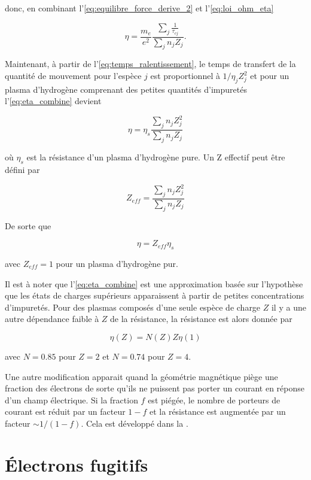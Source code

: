 \documentclass[main.tex]{subfiles}
\begin{document}
\noindent donc, en combinant l'\autoref{eq:equilibre_force_derive_2} et l'\autoref{eq:loi_ohm_eta}

\begin{equation}
	\eta = \frac{m_e}{e^2} \frac{\sum_j \frac{1}{\tau_{cj}}}{\sum_j n_j Z_j}.
	\label{eq:eta_combine}
\end{equation}

\noindent Maintenant, à partir de l'\autoref{eq:temps_ralentissement}, le temps de transfert de la quantité de mouvement pour l'espèce \( j \) est proportionnel à \( 1 / \eta_j Z_j^2 \) et pour un plasma d'hydrogène comprenant des petites quantités d'impuretés l'\autoref{eq:eta_combine} devient

\[
	\eta = \eta_s \frac{\sum_j n_j Z_j^2}{\sum_j n_j Z_j}
\]

\noindent où \( \eta_s \) est la résistance d'un plasma d'hydrogène pure.
Un Z effectif peut être défini par

\[
	Z_{eff} = \frac{\sum_j n_j Z_j^2}{\sum_j n_j Z_j}
\]

De sorte que

\begin{equation}
	\eta = Z_{eff} \eta_s
	\label{eq:resistance_eff}
\end{equation}

\noindent avec \( Z_{eff} = 1 \) pour un plasma d'hydrogène pur.

Il est à noter que l'\autoref{eq:eta_combine} est une approximation basée sur l'hypothèse que les états de charges supérieurs apparaissent à partir de petites concentrations d'impuretés.
Pour des plasmas composés d'une seule espèce de charge \( Z \) il y a une autre dépendance faible à \( Z \) de la résistance, la résistance est alors donnée par

\[
	\eta \left( Z \right) = N \left( Z \right) Z \eta \left( 1 \right)
\]

\noindent avec \( N = 0.85 \) pour \( Z = 2 \) et \( N = 0.74 \) pour \( Z = 4 \).

Une autre modification apparait quand la géométrie magnétique piège une fraction des électrons de sorte qu'ils ne puissent pas porter un courant en réponse d'un champ électrique.
Si la fraction \( f \) est piégée, le nombre de porteurs de courant est réduit par un facteur \( 1 - f \) et la résistance est augmentée par un facteur \( \sim 1 / \left( 1 - f \right) \).
Cela est développé dans la  \color{red}{Section 4.10 (lien à rajouter quand elle sera faite)}\color{black}.

\section{Électrons fugitifs}
\label{sec:fugitif}
\end{document}
